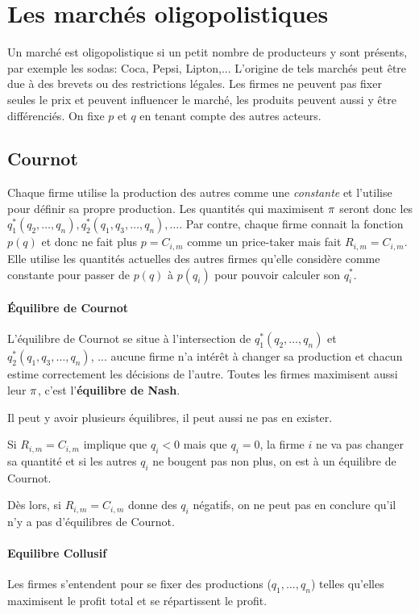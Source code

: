 \section{Les marchés oligopolistiques}
Un marché est oligopolistique si un
petit nombre de producteurs y sont présents,
par exemple les sodas: Coca, Pepsi, Lipton,...
L'origine de tels marchés peut être due à
des brevets ou des restrictions légales.
Les firmes ne peuvent pas fixer seules le prix et peuvent influencer le marché,
les produits peuvent aussi y être différenciés.
On fixe $p$ et $q$ en tenant compte des autres acteurs.

\subsection{Cournot}
Chaque firme utilise la production des autres comme une \emph{constante}
et l'utilise pour définir sa propre production.
Les quantités qui maximisent $\pi$ seront
donc les $q_1^*(q_2, \ldots, q_n), q_2^*(q_1, q_3, \ldots, q_n),\ldots$.
Par contre, chaque firme connait la fonction $p(q)$ et donc ne fait
plus $p = C_{i,m}$ comme un price-taker mais fait $R_{i,m} = C_{i,m}$.
Elle utilise les quantités actuelles des autres firmes qu'elle
considère comme constante pour passer de $p(q)$ à $p(q_i)$
pour pouvoir calculer son $q_i^*$.

\paragraph{Équilibre de Cournot}
L'équilibre de Cournot se situe à l'intersection
de $q_1^*(q_2, \ldots, q_n)$ et $q_2^*(q_1, q_3, \ldots, q_n)$, ...
aucune firme n'a intérêt à changer sa production et chacun estime correctement
les décisions de l'autre.
Toutes les firmes maximisent aussi leur $\pi$,
c'est l'\textbf{équilibre de Nash}.

Il peut y avoir plusieurs équilibres,
il peut aussi ne pas en exister.

Si $R_{i,m} = C_{i,m}$ implique que $q_i < 0$ mais que $q_i = 0$,
la firme $i$ ne va pas changer sa quantité et si les autres $q_i$
ne bougent pas non plus, on est à un équilibre de Cournot.

Dès lors, si $R_{i,m} = C_{i,m}$ donne des $q_i$ négatifs,
on ne peut pas en conclure qu'il n'y a pas d'équilibres de Cournot.

\paragraph{Equilibre Collusif}
Les firmes s'entendent pour se fixer des productions ($q_1,...,q_n$) telles
qu'elles maximisent le profit total et se répartissent le profit.

